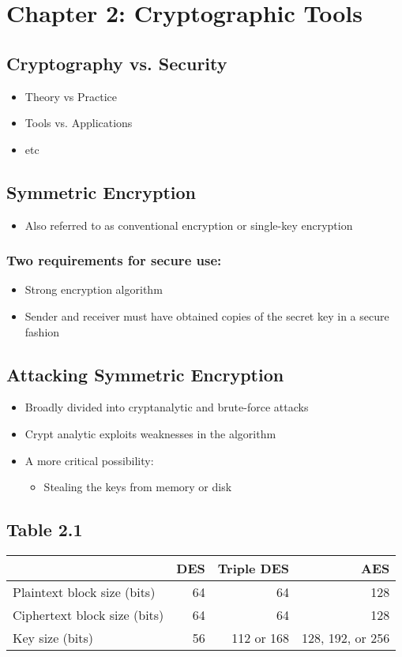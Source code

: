 \documentclass[11pt]{article}
\begin{document}
\section{Chapter 2: Cryptographic Tools}
\label{sec:orgbe22047}
\subsection{Cryptography vs. Security}
\label{sec:org6a5db6d}
\begin{itemize}
\item Theory vs Practice
\item Tools vs. Applications
\item etc
\end{itemize}
\subsection{Symmetric Encryption}
\label{sec:orgea1b2f8}
\begin{itemize}
\item Also referred to as conventional encryption or single-key encryption
\end{itemize}
\subsubsection{Two requirements for secure use:}
\label{sec:org80e0abc}
\begin{itemize}
\item Strong encryption algorithm
\item Sender and receiver must have obtained copies of the secret key in a secure fashion
\end{itemize}
\subsection{Attacking Symmetric Encryption}
\label{sec:org4504a48}
\begin{itemize}
\item Broadly divided into cryptanalytic and brute-force attacks
\item Crypt analytic exploits weaknesses in the algorithm
\item A more critical possibility:
\begin{itemize}
\item Stealing the keys from memory or disk
\end{itemize}
\end{itemize}
\subsection{Table 2.1}
\label{sec:orgd38a9af}
\begin{center}
\begin{tabular}{lrrr}
 & DES & Triple DES & AES\\
\hline
Plaintext block size (bits) & 64 & 64 & 128\\
Ciphertext block size (bits) & 64 & 64 & 128\\
Key size (bits) & 56 & 112 or 168 & 128, 192, or 256\\
\hline
\end{tabular}
\end{center}
\end{document}

